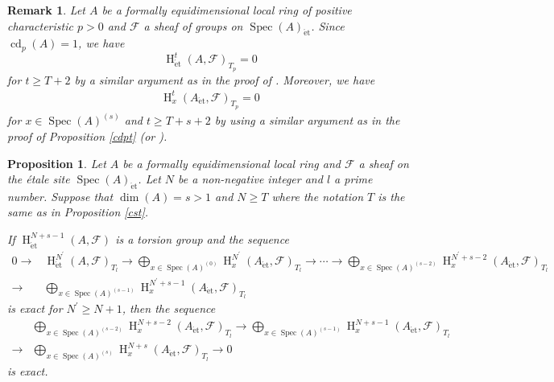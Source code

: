 \documentclass{article}
\newtheorem{prop}[thm]{\indent \sc Proposition}
\newtheorem{rem}[thm]{\indent \sc Remark}
\newcommand{\spec}{\operatorname{Spec}}
\newcommand{\et}{\mathrm{\acute{e}t}}
\newcommand{\HO}{\operatorname{H}}
\begin{document}
%
\begin{rem}\upshape\label{cdsp}
Let $A$ be a formally equidimensional local ring of positive characteristic $p>0$
and $\mathcal{F}$ a sheaf of groups on $\spec(A)_{\et}$.
Since $\operatorname{cd}_{p}(A)=1$,
we have
%
\begin{equation*}
\HO^{t}_{\et}(A,
\mathcal{F})_{T_{p}}
=0
\end{equation*}
%
for $t\geq T+2$ by a similar argument
as in the proof of \cite[Chapter III, \S 3, (3.3.3) Proposition]{N}.
Moreover, we have
%
\begin{align*}
\HO^{t}_{x}(
A_{\et},
\mathcal{F}
)_{T_{p}}
=0
\end{align*}
%
for $x\in \spec(A)^{(s)}$
and
$t\geq T+s+2$ by using a similar argument as in the proof 
of Proposition \ref{cdpt} (or \cite[Chapter III, \S 3, (3.3.3) Proposition]{N}).
\end{rem}
%



%
\begin{prop}\upshape\label{exind}
Let $A$ be a formally equidimensional local ring and
$\mathcal{F}$ a sheaf on the \'{e}tale site
$\spec(A)_{\et}$.
Let $N$ be a non-negative integer and $l$ a prime number.
Suppose that 
$\operatorname{dim}(A)=s>1$ and $N\geq T$ where
the notation $T$ is the same as 
in Proposition \ref{cst}.

If 
$\HO^{N+s-1}_{\et}(A, \mathcal{F})$
is a torsion group and 
the sequence
%
\begin{align*}
0\to& 
\HO^{N^{\prime}}_{\et}(
A, \mathcal{F}
)_{T_{l}}
\to
\bigoplus_{x\in \spec(A)^{(0)}}
\HO^{N^{\prime}}_{x}
(A_{\et}, \mathcal{F})_{T_{l}}
\to 
\cdots 
\to
\bigoplus_{x\in \spec(A)^{(s-2)}}
\HO^{N^{\prime}+s-2}_{x}
(A_{\et}, \mathcal{F})_{T_{l}}
\\
\to&
\bigoplus_{x\in \spec(A)^{(s-1)}}
\HO^{N^{\prime}+s-1}_{x}
(A_{\et}, \mathcal{F})_{T_{l}}
\end{align*}
%
is exact for 
$N^{\prime}\geq N+1$,
then the sequence
%
\begin{align*}
&\bigoplus_{x\in \spec(A)^{(s-2)}} 
\HO^{N+s-2}_{x}(A_{\et}, \mathcal{F})_{T_{l}}
\to
\bigoplus_{x\in \spec(A)^{(s-1)}} 
\HO^{N+s-1}_{x}(A_{\et}, \mathcal{F})_{T_{l}} 
\\
\to&
\bigoplus_{x\in \spec(A)^{(s)}} 
\HO^{N+s}_{x}(A_{\et}, \mathcal{F})_{T_{l}}
\to
0
\end{align*}
%
is exact.
\end{prop}
%
\end{document}

